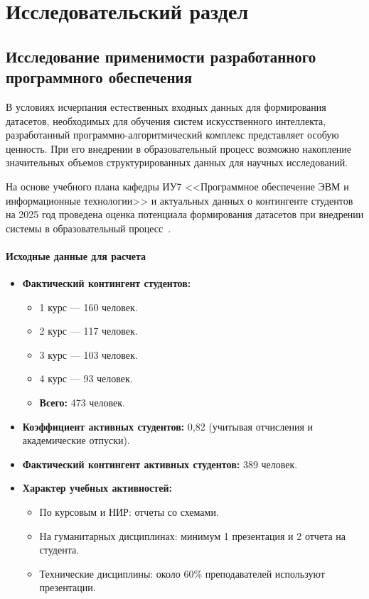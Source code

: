 \chapter{Исследовательский раздел}

\section{Исследование применимости разработанного программного обеспечения}

В условиях исчерпания естественных входных данных для формирования датасетов, необходимых для обучения систем искусственного интеллекта, разработанный программно-алгоритмический комплекс представляет особую ценность.
При его внедрении в образовательный процесс возможно накопление значительных объемов структурированных данных для научных исследований.

На основе учебного плана кафедры ИУ7 <<Программное обеспечение ЭВМ и информационные технологии>> и актуальных данных о контингенте студентов на 2025 год проведена оценка потенциала формирования датасетов при внедрении системы в образовательный процесс~\cite{plan, students}.

\subsubsection{Исходные данные для расчета}

\begin{itemize}[wide=12.5mm, leftmargin=12.5mm]
    \item \textbf{Фактический контингент студентов:}
    \begin{itemize}[wide=12.5mm, leftmargin=12.5mm]
        \item 1 курс — 160 человек.
        \item 2 курс — 117 человек.
        \item 3 курс — 103 человек.
        \item 4 курс — 93 человек.
        \item \textbf{Всего:} 473 человек.
    \end{itemize}
    \item \textbf{Коэффициент активных студентов:} 0,82 (учитывая отчисления и академические отпуски).
    \item \textbf{Фактический контингент активных студентов:} 389 человек.
    \item \textbf{Характер учебных активностей:}
    \begin{itemize}[wide=12.5mm, leftmargin=12.5mm]
        \item По курсовым и НИР: отчеты со схемами.
        \item На гуманитарных дисциплинах: минимум 1 презентация и 2 отчета на студента.
        \item Технические дисциплины: около 60\% преподавателей используют презентации.
    \end{itemize}
\end{itemize}

